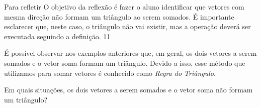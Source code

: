 \begin{objectives}{Para refletir}
{O objetivo da reflexão é fazer o aluno identificar que vetores com mesma direção não formam um triângulo ao serem somados. É importante esclarecer que, neste caso, o triângulo não vai existir, mas a operação deverá ser executada seguindo a definição.}
{1}{1}
\end{objectives}

É possível observar nos exemplos anteriores que, em geral, os dois vetores a serem somados e o vetor soma formam um triângulo. Devido a isso, esse método que utilizamos para somar vetores é conhecido como \textit{Regra do Triângulo}.




\begin{reflection}

Em quais situações, os dois vetores a serem somados e o vetor soma não formam um triângulo?
\end{reflection}



